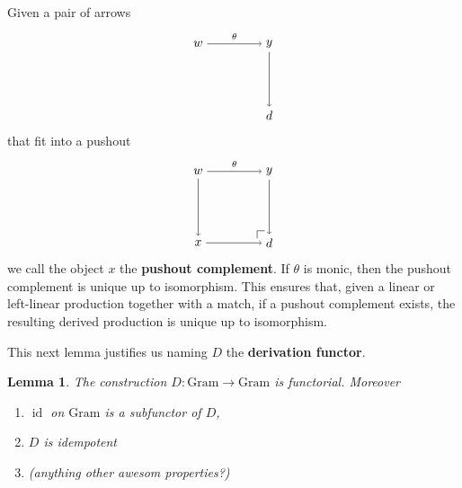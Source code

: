 \documentclass{amsart}
\newcommand{\Gram}{\cat{Gram}}
\newcommand{\defn}[1]{\textbf{#1}}
\newcommand{\cat}[1]{\mathrm{#1}}
\newcommand{\edit}[1]{\textcolor{editcolour}{(#1)}}
\newcommand{\from}{\colon}
\DeclareMathOperator{\id}{id}
\newtheorem{lemma}[theorem]{Lemma}
\theoremstyle{remark}
\theoremstyle{definition}
\begin{document}
Given a pair of arrows
\[
  \begin{tikzpicture}
    \node (1) at (-1,1) {\( w \)};
    \node (3) at (1,1) {\( y \)};
    \node (4) at (1,-1) {\( d \)};
    \draw [->] (1) to node [above] {\scriptsize{\( \theta \)}} (3);
    \draw [->] (3) to node [right] {\scriptsize{\(  \)}} (4);
  \end{tikzpicture}
\]
that fit into a pushout
\[
  \begin{tikzpicture}
    \node (1) at (-1,1) {\( w \)};
    \node (2) at (-1,-1) {\( x \)};
    \node (3) at (1,1) {\( y \)};
    \node (4) at (1,-1) {\( d \)};
    \draw [->] (1) to node [left] {\scriptsize{\(  \)}} (2);
    \draw [->] (1) to node [above] {\scriptsize{\( \theta \)}} (3);
    \draw [->] (2) to node [above] {\scriptsize{\(  \)}} (4);
    \draw [->] (3) to node [right] {\scriptsize{\(  \)}} (4);
    \node (a) at (0.66,-1) {};
    \node (b) at (0.66,-0.66) {};
    \node (c) at (1,-0.66) {};
    \draw (a) -- (b.center);
    \draw (b.center) -- (c);
  \end{tikzpicture}
\]
we call the object $ x $ the \defn{pushout complement}. If $ \theta $
is monic, then the pushout complement is unique up to isomorphism.
%
%
This ensures that, given a linear or left-linear production together
with a match, if a pushout complement exists, the resulting derived
production is unique up to isomorphism.

This next lemma justifies us naming $ D $ the \defn{derivation
  functor}.

\begin{lemma}
  The construction $ D \from \Gram \to \Gram $ is functorial.
  Moreover
  \begin{enumerate}
  \item $ \id $ on $ \Gram $ is a subfunctor of $ D $,
  \item $ D $ is idempotent
  \item \edit{anything other awesom properties?}
  \end{enumerate}
\end{lemma}
\end{document}
